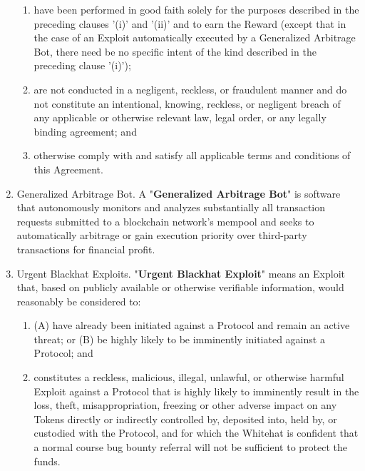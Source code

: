 \documentclass{article}
\begin{document}
\begin{enumerate}[label=\Alph*.]
\begin{enumerate}
              \item have been performed in good faith solely for the purposes described in the preceding clauses '(i)' and '(ii)' and to earn the Reward (except that in the case of an Exploit automatically executed by a Generalized Arbitrage Bot, there need be no specific intent of the kind described in the preceding clause '(i)');

              \item are not conducted in a negligent, reckless, or fraudulent manner and do not constitute an intentional, knowing, reckless, or negligent breach of any applicable or otherwise relevant law, legal order, or any legally binding agreement; and

              \item otherwise comply with and satisfy all applicable terms and conditions of this Agreement.

          \end{enumerate}

    \item Generalized Arbitrage Bot. A "\textbf{Generalized Arbitrage Bot}" is software that autonomously monitors and analyzes substantially all transaction requests submitted to a blockchain network's mempool and seeks to automatically arbitrage or gain execution priority over third-party transactions for financial profit.

    \item Urgent Blackhat Exploits. "\textbf{Urgent Blackhat Exploit}" means an Exploit that, based on publicly available or otherwise verifiable information, would reasonably be considered to:

          \begin{enumerate}

              \item (A) have already been initiated against a Protocol and remain an active threat; or (B) be highly likely to be imminently initiated against a Protocol; and

              \item constitutes a reckless, malicious, illegal, unlawful, or otherwise harmful Exploit against a Protocol that is highly likely to imminently result in the loss, theft, misappropriation, freezing or other adverse impact on any Tokens directly or indirectly controlled by, deposited into, held by, or custodied with the Protocol, and for which the Whitehat is confident that a normal course bug bounty referral will not be sufficient to protect the funds.
          \end{enumerate}
\end{enumerate}
\end{document}
